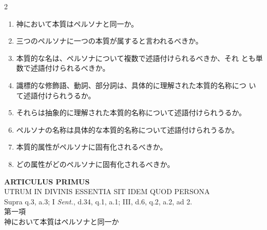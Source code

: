 \documentclass[paper=a4paper,fontsize=10pt,jafontsize=9pt,titlepage]{jlreq}
\begin{document}
\begin{paracol}{2}
\begin{enumerate}
 \item 神において本質はペルソナと同一か。
 \item 三つのペルソナに一つの本質が属すると言われるべきか。
 \item 本質的な名は、ペルソナについて複数で述語付けられるべきか、それ
       とも単数で述語付けられるべきか。
 \item 識標的な修飾語、動詞、部分詞は、具体的に理解された本質的名称につ
       いて述語付けられうるか。
 \item それらは抽象的に理解された本質的名称について述語付けられうるか。
 \item ペルソナの名称は具体的な本質的名称について述語付けられうるか。
 \item 本質的属性がペルソナに固有化されるべきか。
 \item どの属性がどのペルソナに固有化されるべきか。

\end{enumerate}

\switchcolumn*

\end{paracol}



\newpage



\begin{center}
 {\Large {\bfseries ARTICULUS PRIMUS}}\\
 {\large UTRUM IN DIVINIS ESSENTIA SIT IDEM QUOD PERSONA}\\
 {\footnotesize Supra q.3, a.3; I {\itshape Sent.}, d.34, q.1, a.1; III,
 d.6, q.2, a.2, ad 2.}\\
 {\Large 第一項\\神において本質はペルソナと同一か}
\end{center}
\end{document}
